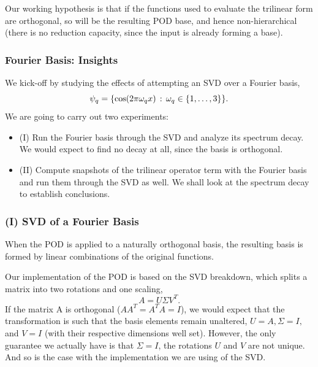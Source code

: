 \documentclass[../../thesis.tex]{subfiles}
\begin{document}
Our working hypothesis is that if the functions used to evaluate the 
trilinear form are orthogonal, so will be the resulting POD base,
and hence non-hierarchical 
(there is no reduction capacity, since the input is already forming a base).

\subsubsection{Fourier Basis: Insights}
We kick-off by studying the effects of attempting an SVD over a Fourier basis, 
\begin{equation}
    \psi_q = \qty{\cos(2 \pi \omega_q x) \, : \, \omega_q \in \qty{1, \ldots, 3}}.
\end{equation}
We are going to carry out two experiments:
\begin{itemize}
    \item (I) Run the Fourier basis through the SVD and analyze its spectrum decay. 
    We would expect to find no decay at all, since the basis is orthogonal.
    \item (II) Compute snapshots of the trilinear operator term with the Fourier basis
    and run them through the SVD as well.
    We shall look at the spectrum decay to establish conclusions. 
\end{itemize}

\subsubsection{(I) SVD of a Fourier Basis}
When the POD is applied to a naturally orthogonal basis, 
the resulting basis is formed by linear combinations of the original functions.

Our implementation of the POD is based on the SVD breakdown, which splits a matrix into 
two rotations and one scaling,
\begin{equation}
    A = U \Sigma V^T.
\end{equation}
If the matrix A is orthogonal ($AA^T = A^T A = I$),
we would expect that the transformation is such that the basis elements
remain unaltered,
$U=A, \Sigma = I,$ and $V=I$ 
(with their respective dimensions well set).
However, the only guarantee we actually have is that $\Sigma = I$,
the rotations $U$ and $V$ are not unique.
And so is the case with the implementation we are using of the SVD.
\end{document}
